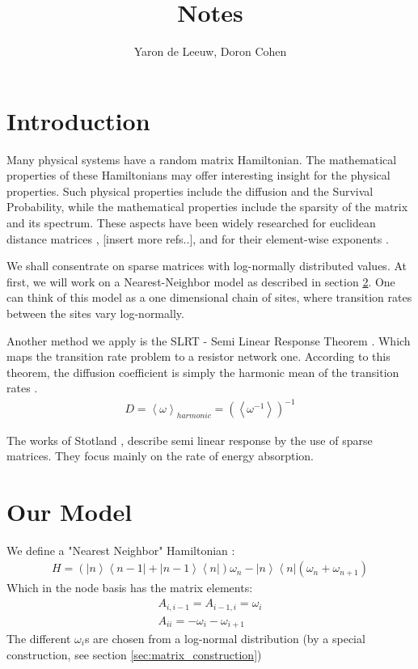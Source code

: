 \documentclass[onecolumn,fleqn]{revtex4}
\newcommand{\aket}[1]{\left| #1 \right\rangle}
\newcommand{\abra}[1]{\left\langle #1 \right|}
\newcommand{\avg}[1]{\left\langle #1 \right\rangle}
\begin{document}
\title{Notes}

\author{Yaron de Leeuw, Doron Cohen}

\maketitle



\section{Introduction}
Many physical systems have a random matrix Hamiltonian. The mathematical properties of these Hamiltonians may offer interesting insight for the physical properties. Such physical properties include the diffusion and the Survival Probability, while the mathematical properties include the sparsity of the matrix and its spectrum. These aspects have been widely researched for euclidean distance matrices \cite{Mezard:1999:NPB}, [insert more refs..], and for their element-wise exponents \cite{Amir:2010:PRL}. 

We shall consentrate on sparse matrices with log-normally distributed values. At first, we will work on a Nearest-Neighbor model as described in section \ref{sec:our_model}. One can think of this model as a one dimensional chain of sites, where transition rates between the sites vary log-normally.


Another method we apply is the SLRT - Semi Linear Response Theorem \cite{Stotland:2010:PRB}. Which maps the transition rate problem to a resistor network one. According to this theorem, the diffusion coefficient is simply the harmonic mean of the transition rates .
\begin{align}
D=\avg{\omega}_{harmonic} =(\avg{\omega^{-1}})^{-1}
\end{align}


The works of Stotland \cite{Stotland:2010:PRB} \cite{Stotland:2009:EPL}, describe semi linear response by the use of sparse matrices. They focus mainly on the rate of energy absorption.



\section{Our Model}\label{sec:our_model}
We define a "Nearest Neighbor" Hamiltonian :
\begin{align}
H = (\aket{n}\abra{n-1}+\aket{n-1}\abra{n})\omega_n - \aket{n}\abra{n}(\omega_{n} + \omega_{n+1})
\end{align}
Which in the node basis has the matrix elements:
\begin{align}
A_{i,i-1} = A_{i-1,i} = \omega_i \\
A_{ii} = -\omega_i - \omega_{i+1}
\end{align}
The different $\omega_i$s are chosen from a log-normal distribution (by a special construction, see section \ref{sec:matrix_construction})
\end{document}
